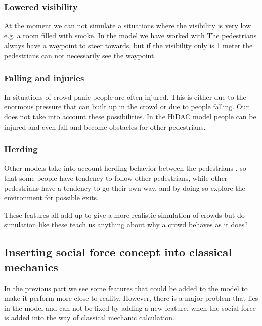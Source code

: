 \subsubsection{Lowered visibility}
At the moment we can not simulate a situations where the visibility is very low 
e.g. a room filled with smoke. In the model we have worked with The pedestrians always 
have a waypoint to steer towards, but if the visibility only is 1 meter the 
pedestrians can not necessarily see the waypoint. \cite{HelbingNew}

\subsubsection{Falling and injuries}
In situations of crowd panic people are often injured. This is either due to the 
enormous pressure that can built up in the crowd or due to people falling. Our 
does not take into account these possibilities. In the HiDAC model people can 
be injured and even fall and become obstacles for other pedestrians.\cite{HiDAC}

\subsubsection{Herding}
Other models take into account herding behavior between the pedestrians  
\cite{helbing00}, so that some people have tendency to follow other pedestrians, 
while other pedestrians have a tendency to go their own way,  and by doing so 
explore the environment for possible exits.

These features all add up to give a more realistic simulation of crowds 
but do simulation like these teach us anything about why a crowd behaves 
as it does?

\subsection{Inserting social force concept into classical mechanics}
\label{subsec:development}
In the previous part we see some features that could be added to the model to 
make it perform more close to reality. However, there is a major problem that 
lies in the model and can not be fixed by adding a new feature, when the 
social force is added into the way of classical mechanic calculation.


